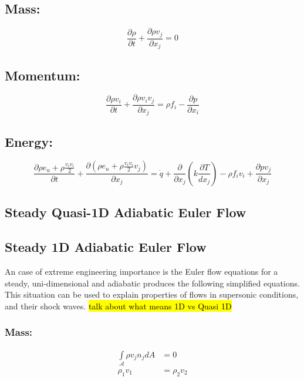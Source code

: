 \subsection*{Mass:}
\begin{equation}
    \frac{\partial \rho}{\partial t} +  \frac{\partial \rho v_j}{\partial x_j} = 0
\end{equation}

\subsection*{Momentum:}
\begin{equation}
    \frac{\partial \rho v_i}{\partial t} +  \frac{\partial \rho v_i v_j}{\partial x_j} = \rho f_i - \frac{\partial p}{\partial x_i}
\end{equation}

\subsection*{Energy:}
\begin{equation}
    \frac{\partial \rho e_u+ \rho\frac{v_i v_i}{2}}{\partial t} +  \frac{\partial (\rho e_u + \rho\frac{v_i v_i}{2} v_j)}{\partial x_j} =  \dot{q} + \frac{\partial} {\partial x_j} \left( k\frac{\partial T}{d x_j} \right) - \rho f_i v_i  + \frac{\partial  p v_j }{\partial x_j}
\end{equation}


\subsection{Steady Quasi-1D Adiabatic Euler Flow}




\subsection{Steady 1D Adiabatic Euler Flow}
\label{1d_adiabatic_inviscid}
An case of extreme engineering importance is the Euler flow equations for a steady, uni-dimensional and adiabatic produces the following simplified equations.
This situation can be used to explain properties of flows in supersonic conditions, and their shock waves.
\hl{talk about what means 1D vs Quasi 1D}

\subsubsection*{Mass:}
\begin{align}
    \int\limits_{\mathcal{A}} \rho v_j n_j dA &= 0 \\
    \rho_1 v_1  &=\rho_2 v_2
\end{align}

